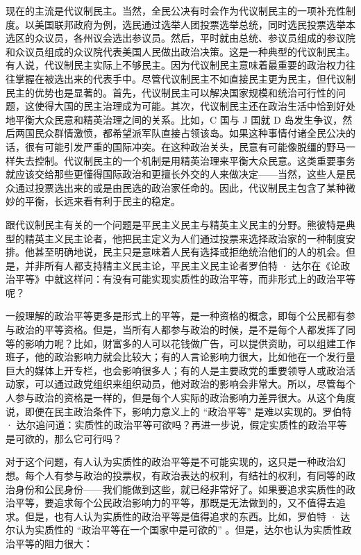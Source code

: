 现在的主流是代议制民主。当然，全民公决有时会作为代议制民主的一项补充性制度。以美国联邦政府为例，选民通过选举人团投票选举总统，同时选民投票选举本选区的众议员，各州议会选出参议员。然后，平时就由总统、参议员组成的参议院和众议员组成的众议院代表美国人民做出政治决策。这是一种典型的代议制民主。有人说，代议制民主实际上不够民主。因为代议制民主意味着最重要的政治权力往往掌握在被选出来的代表手中。尽管代议制民主不如直接民主更为民主，但代议制民主的优势也是显著的。首先，代议制民主可以解决国家规模和统治可行性的问题，这使得大国的民主治理成为可能。其次，代议制民主还在政治生活中恰到好处地平衡大众民意和精英治理之间的关系。比如，C 国与 J 国就 D 岛发生争议，然后两国民众群情激愤，都希望派军队直接占领该岛。如果这种事情付诸全民公决的话，很有可能引发严重的国际冲突。在这种政治关头，民意有可能像脱缰的野马一样失去控制。代议制民主的一个机制是用精英治理来平衡大众民意。这类重要事务就应该交给那些更懂得国际政治和更擅长外交的人来做决定——当然，这些人是民众通过投票选出来的或是由民选的政治家任命的。因此，代议制民主包含了某种微妙的平衡，长远来看有利于民主的稳定。

跟代议制民主有关的一个问题是平民主义民主与精英主义民主的分野。熊彼特是典型的精英主义民主论者，他把民主定义为人们通过投票来选择政治家的一种制度安排。他甚至明确地说，民主只是意味着人民有选择或拒绝统治他们的人的机会。但是，并非所有人都支持精主义民主论，平民主义民主论者罗伯特 · 达尔在《论政治平等》中就这样问：有没有可能实现实质性的政治平等，而非形式上的政治平等呢？

一般理解的政治平等更多是形式上的平等，是一种资格的概念，即每个公民都有参与政治的平等资格。但是，当所有人都参与政治的时候，是不是每个人都发挥了同等的影响力呢？比如，财富多的人可以花钱做广告，可以提供资助，可以组建工作班子，他的政治影响力就会比较大；有的人言论影响力很大，比如他在一个发行量巨大的媒体上开专栏，也会影响很多人；有的人是主要政党的重要领导人或政治活动家，可以通过政党组织来组织动员，他对政治的影响会非常大。所以，尽管每个人参与政治的资格是一样的，但是每个人实际的政治影响力差异很大。从这个角度说，即便在民主政治条件下，影响力意义上的 “政治平等” 是难以实现的。罗伯特 · 达尔追问道：实质性的政治平等可欲吗？再进一步说，假定实质性的政治平等是可欲的，那么它可行吗？

对于这个问题，有人认为实质性的政治平等是不可能实现的，这只是一种政治幻想。每个人有参与政治的投票权，有政治表达的权利，有结社的权利，有同等的政治身份和公民身份——我们能做到这些，就已经非常好了。如果要追求实质性的政治平等，要追求每个公民政治影响力的平等，那既是无法做到的，又不值得去追求。但是，也有人认为实质性的政治平等是值得追求的东西。比如，罗伯特 · 达尔认为实质性的 “政治平等在一个国家中是可欲的” 。但是，达尔也认为实质性政治平等的阻力很大：

